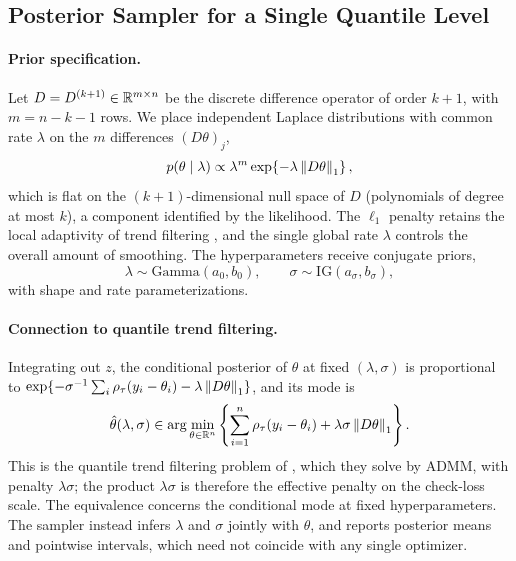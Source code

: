 \subsection{Posterior Sampler for a Single Quantile Level}
\label{subsec:individual}

\paragraph{Prior specification.} Let $D = D^{(k+1)} \in \mathbb{R}^{m \times n}$ be the discrete difference operator of order $k+1$, with $m = n - k - 1$ rows. We place independent Laplace distributions with common rate $\lambda$ on the $m$ differences $(D\theta)_j$,
\begin{equation}
    p(\theta \mid \lambda) \propto \lambda^{m} \exp\!\left\{-\lambda \left\lVert D\theta\right\rVert_1\right\},
    \label{eq:prior_theta}
\end{equation}
which is flat on the $(k+1)$-dimensional null space of $D$ (polynomials of degree at most $k$), a component identified by the likelihood. The $\ell_1$ penalty retains the local adaptivity of trend filtering \citep{tibshirani2014adaptive}, and the single global rate $\lambda$ controls the overall amount of smoothing. The hyperparameters receive conjugate priors,
\begin{equation}
    \lambda \sim \mathrm{Gamma}(a_0, b_0), \qquad \sigma \sim \mathrm{IG}(a_\sigma, b_\sigma),
    \label{eq:hyperpriors}
\end{equation}
with shape and rate parameterizations.

\paragraph{Connection to quantile trend filtering.} Integrating out $z$, the conditional posterior of $\theta$ at fixed $(\lambda, \sigma)$ is proportional to $\exp\{-\sigma^{-1}\sum_i \rho_\tau(y_i-\theta_i) - \lambda\left\lVert D\theta\right\rVert_1\}$, and its mode is
\begin{equation}
    \hat{\theta}(\lambda, \sigma) \in \arg\min_{\theta \in \mathbb{R}^n} \left\{ \sum_{i=1}^n \rho_\tau(y_i-\theta_i) + \lambda\sigma \left\lVert D\theta\right\rVert_1 \right\}.
    \label{eq:map_qtf}
\end{equation}
This is the quantile trend filtering problem of \citet{brantley2020baseline}, which they solve by ADMM, with penalty $\lambda\sigma$; the product $\lambda\sigma$ is therefore the effective penalty on the check-loss scale. The equivalence concerns the conditional mode at fixed hyperparameters. The sampler instead infers $\lambda$ and $\sigma$ jointly with $\theta$, and reports posterior means and pointwise intervals, which need not coincide with any single optimizer.

